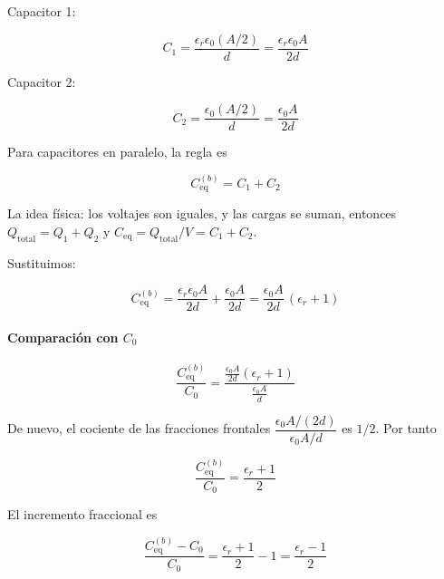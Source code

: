 \documentclass{article}
\begin{document}
Capacitor 1:

\begin{equation}
C_{1} = \frac{\epsilon_{r}\epsilon_{0}(A/2)}{d}
= \frac{\epsilon_{r}\epsilon_{0}A}{2d}
\label{eq:C1-b}
\end{equation}

Capacitor 2:

\begin{equation}
C_{2} = \frac{\epsilon_{0}(A/2)}{d}
= \frac{\epsilon_{0}A}{2d}
\label{eq:C2-b}
\end{equation}

Para capacitores en paralelo, la regla es

\begin{equation}
C_{\text{eq}}^{(b)} = C_{1} + C_{2}
\label{eq:paralelo-regla}
\end{equation}

La idea física: los voltajes son iguales, y las cargas se suman, entonces $Q_{\text{total}} = Q_{1} + Q_{2}$ y $C_{\text{eq}} = Q_{\text{total}}/V = C_{1}+C_{2}$.

Sustituimos:

\begin{equation}
C_{\text{eq}}^{(b)} 
= \frac{\epsilon_{r}\epsilon_{0}A}{2d}
 + \frac{\epsilon_{0}A}{2d}
= \frac{\epsilon_{0}A}{2d}\,(\epsilon_{r}+1)
\label{eq:Ceqa-b}
\end{equation}

\paragraph{Comparación con $C_{0}$}

\begin{equation}
\frac{C_{\text{eq}}^{(b)}}{C_{0}}
= \frac{\displaystyle \frac{\epsilon_{0}A}{2d}(\epsilon_{r}+1)}
       {\displaystyle \frac{\epsilon_{0}A}{d}}
\label{eq:razon-Cb-paso1}
\end{equation}

De nuevo, el cociente de las fracciones frontales $\dfrac{\epsilon_{0}A/(2d)}{\epsilon_{0}A/d}$ es $1/2$. Por tanto

\begin{equation}
\frac{C_{\text{eq}}^{(b)}}{C_{0}}
= \frac{\epsilon_{r}+1}{2}
\label{eq:razon-Cb}
\end{equation}

El incremento fraccional es

\begin{equation}
\frac{C_{\text{eq}}^{(b)} - C_{0}}{C_{0}}
= \frac{\epsilon_{r}+1}{2} - 1
= \frac{\epsilon_{r}-1}{2}
\label{eq:incremento-b}
\end{equation}
\end{document}
